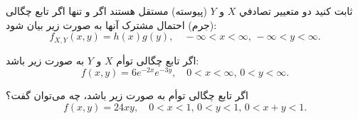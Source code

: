 \problem{}
\subproblem{}
ثابت کنید دو متعيير تصادفي $X$ و $Y$ (پیوسته) مستقل هستند اگر و تنها اگر
تابع چگالی (جرم)
احتمال مشترک آنها به صورت زیر بیان شود:
\[
f_{X,Y}(x, y) = h(x)g(y), \quad -\infty < x < \infty, \, -\infty < y < \infty.
\]

\subproblem{}
اگر تابع چگالی توأم $X$ و $Y$ به صورت زیر باشد:\\
\[
f(x, y) = 6e^{-2x}e^{-3y}, \quad 0 < x < \infty, \, 0 < y < \infty.
\]

\subproblem{}
اگر تابع چگالی توأم به صورت زیر باشد، چه می‌توان گفت؟
\[
f(x, y) = 24xy, \quad 0 < x < 1, \, 0 < y < 1, \, 0 < x + y < 1.
\]